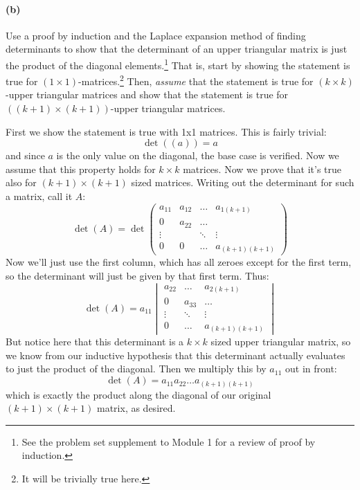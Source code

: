 \documentclass{article}
\begin{document}
\paragraph{(b)}
Use a proof by induction and the Laplace expansion method of finding determinants to show that the determinant of an upper triangular matrix is just the product of the
diagonal elements.\footnote{See the problem set supplement to Module 1 for a review of proof by induction.}  
That is, start by showing the statement is true for $(1\times 1)$-matrices.\footnote{It will be trivially true here.}  Then, \emph{assume}
that the statement is true for $(k\times k)$-upper triangular matrices and show that the statement is true for $((k+1)\times(k+1))$-upper triangular matrices.
\\

\begin{solution}
	First we show the statement is true with 1x1 matrices. This is fairly trivial:
	\[
	\det((a)) = a
	\] 
	and since $a$ is the only value on the diagonal, the base case is verified. Now we assume that this property
	holds for $k \times k$ matrices. Now we prove that it's true also for $(k+1) \times (k+1)$ sized
	matrices. Writing out the determinant for such a matrix, call it $A$:
	\[
		\det(A) = \det\begin{pmatrix} a_{11} & a_{12} & \dots & a_{1 (k+1)}\\
		0 & a_{22} & \dots \\
	\vdots & & \ddots & \vdots\\
0 & 0 & \dots & a_{(k+1) (k+1)}\end{pmatrix}
	\]	
	Now we'll just use the first column, which has all zeroes except for the first term, so the determinant
	will just be given by that first term. Thus:
	\[
		\det(A) = a_{11} \begin{vmatrix} a_{22} & \dots & a_{2 (k+1)}\\ 0 & a_{33} & \dots  \\
			\vdots & \ddots & \vdots\\
		0  & \dots & a_{(k+1) (k+1)}\end{vmatrix}
	\] 
	But notice here that this determinant is a $k\times k$ sized upper
	triangular matrix, so we know from our inductive hypothesis that this 
	determinant actually evaluates to just the product of the 
	diagonal. Then we multiply this by $a_{11}$ out in front: 
	\[
		\det(A) = a_{11}a_{22} \dots a_{(k+1)(k+1)}
	\]
	which is exactly the product along the diagonal of our original 
	$(k+1) \times (k+1)$ matrix, as desired. 
\end{solution}
\end{document}
